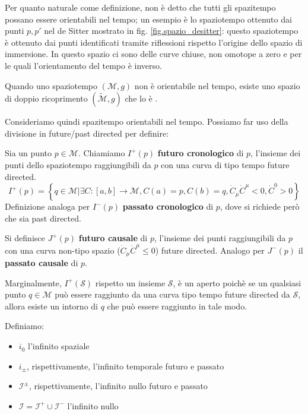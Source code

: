 Per quanto naturale come definizione, non è detto che tutti gli spazitempo possano essere orientabili nel tempo;  un esempio è lo spaziotempo ottenuto dai  punti $p, p'$  nel de Sitter mostrato in fig. \ref{fig.spazio_desitter}: questo spaziotempo è ottenuto dai punti identificati tramite riflessioni rispetto l'origine dello spazio di immersione. In questo spazio ci sono delle curve chiuse, non omotope a zero e per le quali l'orientamento del tempo è inverso. 

Quando uno spaziotempo $(\mathcal{M}, g)$ non è orientabile nel tempo, esiste uno spazio di doppio ricoprimento $(\tilde{\mathcal{M}},g)$ che lo è \cite{hawking}.

Consideriamo quindi spazitempo orientabili nel tempo. Possiamo far uso della divisione in future/past directed per definire:
\begin{definizione}
    Sia un punto $p \in \mathcal{M}$. Chiamiamo $I^+(p)$ \textbf{futuro cronologico} di $p$, l'insieme dei punti dello spaziotempo raggiungibili da $p$ con una curva di tipo tempo future directed.
    \begin{equation*}
        I^+(p)=\left\{ q \in \mathcal{M} | \exists C:[a,b]\rightarrow \mathcal{M}, C(a)= p, C(b)= q, \Dot{C}_\mu \Dot{C}^\mu < 0, \Dot{C}^0 >0 \right\}
    \end{equation*}
Definizione analoga per $I^-(p)$ \textbf{passato cronologico} di $p$, dove si richiede però che sia past directed.

Si definisce $J^+(p)$ \textbf{futuro causale} di $p$, l'insieme dei punti raggiungibili da $p$ con una curva non-tipo spazio ($\Dot{C}_\mu \Dot{C}^\mu \leq 0$) future directed. Analogo per $J^-(p)$ il \textbf{passato causale} di $p$.
\end{definizione}
Marginalmente, $I^+(\mathcal{S})$ rispetto un insieme $\mathcal{S}$, è un aperto poichè se un qualsiasi punto $q \in \mathcal{M}$ può essere raggiunto da una curva tipo tempo future directed da $\mathcal S$, allora esiste un intorno di $q$ che può essere raggiunto in tale modo.

\begin{definizione}
Definiamo:
\begin{itemize}
    \item $i_0$ l'infinito spaziale
    \item $i_\pm$, rispettivamente, l'infinito temporale futuro e passato
    \item $\mathcal{I}^\pm$, rispettivamente, l'infinito nullo futuro e passato
    \item $\mathcal{I} = \mathcal{I}^+ \cup \mathcal{I}^-$ l'infinito nullo
\end{itemize}
\end{definizione}

